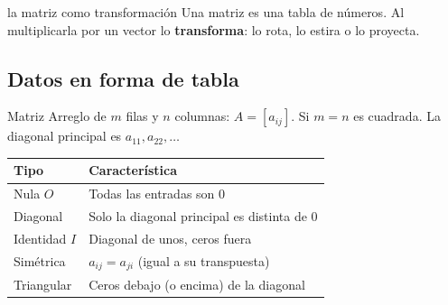 \begin{tmconcepto}{la matriz como transformaci\'on}
Una matriz es una tabla de n\'umeros. Al multiplicarla por un vector lo \textbf{transforma}: lo rota, lo estira o lo proyecta.
\end{tmconcepto}


\subsection{Datos en forma de tabla}
\begin{tmdef}{Matriz}
Arreglo de $m$ filas y $n$ columnas: $A=[a_{ij}]$. Si $m=n$ es cuadrada. La diagonal principal es $a_{11}, a_{22},\dots$
\end{tmdef}

\begin{center}
\end{center}

\begin{center}
\begin{tabular}{|p{4cm}|p{8.5cm}|}
\hline
\rowcolor{tmAzulClaro}\textbf{Tipo} & \textbf{Caracter\'istica}\\ \hline
Nula $O$ & Todas las entradas son 0\\ \hline
Diagonal & Solo la diagonal principal es distinta de 0\\ \hline
Identidad $I$ & Diagonal de unos, ceros fuera\\ \hline
Sim\'etrica & $a_{ij}=a_{ji}$ (igual a su transpuesta)\\ \hline
Triangular & Ceros debajo (o encima) de la diagonal\\ \hline
\end{tabular}
\end{center}

